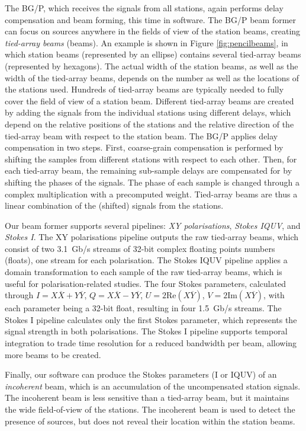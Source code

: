 \documentclass{llncs}
\begin{document}
The BG/P, which receives the signals from all stations, again performs delay compensation and beam forming, this time in software. The BG/P beam former can focus on sources anywhere in the fields of view of the station beams, creating \emph{tied-array beams} (beams). An example is shown in Figure \ref{fig:pencilbeams}, in which station beams (represented by an ellipse) contains several tied-array beams (represented by hexagons). The actual width of the station beams, as well as the width of the tied-array beams, depends on the number as well as the locations of the stations used. Hundreds of tied-array beams are typically needed to fully cover the field of view of a station beam. Different tied-array beams are created by adding the signals from the individual stations using different delays, which depend on the relative positions of the stations and the relative direction of the tied-array beam with respect to the station beam. The BG/P applies delay compensation in two steps. First, coarse-grain compensation is performed by shifting the samples from different stations with respect to each other. Then, for each tied-array beam, the remaining sub-sample delays are compensated for by shifting the phases of the signals. The phase of each sample is changed through a complex multiplication with a precomputed weight. Tied-array beams are thus a linear combination of the (shifted) signals from the stations.

Our beam former supports several pipelines: \emph{XY polarisations}, \emph{Stokes IQUV}, and \emph{Stokes I}. The XY polarisations pipeline outputs the raw tied-array beams, which consist of two 3.1~Gb/s streams of 32-bit complex floating points numbers (floats), one stream for each polarisation. The Stokes IQUV pipeline applies a domain transformation to each sample of the raw tied-array beams, which is useful for polarisation-related studies. The four Stokes parameters, calculated through $I = X\overline{X} + Y\overline{Y}$, $Q = X\overline{X} - Y\overline{Y}$, $U = 2\mathrm{Re}(X\overline{Y})$, $V = 2\mathrm{Im}(X\overline{Y})$, with each parameter being a 32-bit float, resulting in four 1.5~Gb/s streams. The Stokes I pipeline calculates only the first Stokes parameter, which represents the signal strength in both polarisations. The Stokes I pipeline supports temporal integration to trade time resolution for a reduced bandwidth per beam, allowing more beams to be created.

Finally, our software can produce the Stokes parameters (I or IQUV) of an \emph{incoherent} beam, which is an accumulation of the uncompensated station signals. The incoherent beam is less sensitive than a tied-array beam, but it maintains the wide field-of-view of the stations. The incoherent beam is used to detect the presence of sources, but does not reveal their location within the station beams.
\end{document}
